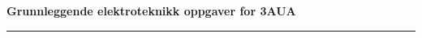 \centerline\textbf{Grunnleggende elektroteknikk oppgaver for 3AUA}  \bigskip

\bigskip 
\hrule
\vfil \eject
